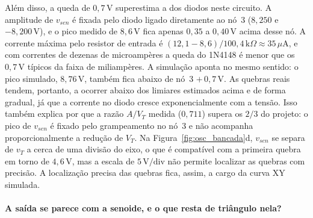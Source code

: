 \documentclass[11pt,a4paper]{article}
\begin{document}
Além disso, a queda de $0{,}7\,\text{V}$ superestima a dos diodos neste circuito. A amplitude de $v_{sen}$ é fixada pelo diodo ligado diretamente ao nó~3 ($8{,}250$ e $-8{,}200\,\text{V}$), e o pico medido de $8{,}6\,\text{V}$ fica apenas $0{,}35$ a $0{,}40\,\text{V}$ acima desse nó. A corrente máxima pelo resistor de entrada é $(12{,}1 - 8{,}6)/100{,}4\,\text{k}\Omega \approx 35\,\mu\text{A}$, e com correntes de dezenas de microampères a queda do 1N4148 é menor que os $0{,}7\,\text{V}$ típicos da faixa de miliampères. A simulação aponta no mesmo sentido: o pico simulado, $8{,}76\,\text{V}$, também fica abaixo de nó~3 $+\,0{,}7\,\text{V}$. As quebras reais tendem, portanto, a ocorrer abaixo dos limiares estimados acima e de forma gradual, já que a corrente no diodo cresce exponencialmente com a tensão. Isso também explica por que a razão $A/V_T$ medida ($0{,}711$) supera os $2/3$ do projeto: o pico de $v_{sen}$ é fixado pelo grampeamento no nó~3 e não acompanha proporcionalmente a redução de $V_T$. Na Figura~\ref{fig:osc_bancada}d, $v_{sen}$ se separa de $v_T$ a cerca de uma divisão do eixo, o que é compatível com a primeira quebra em torno de $4{,}6\,\text{V}$, mas a escala de $5\,\text{V/div}$ não permite localizar as quebras com precisão. A localização precisa das quebras fica, assim, a cargo da curva XY simulada.

\paragraph{A saída se parece com a senoide, e o que resta de triângulo nela?}
\end{document}

